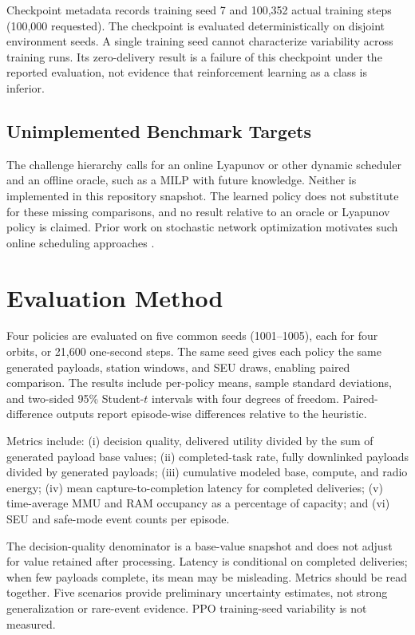 \documentclass[11pt,letterpaper]{article}
\begin{document}
Checkpoint metadata records training seed 7 and 100,352 actual training steps (100,000 requested). The checkpoint is evaluated deterministically on disjoint environment seeds. A single training seed cannot characterize variability across training runs. Its zero-delivery result is a failure of this checkpoint under the reported evaluation, not evidence that reinforcement learning as a class is inferior.

\subsection{Unimplemented Benchmark Targets}
The challenge hierarchy calls for an online Lyapunov or other dynamic scheduler and an offline oracle, such as a MILP with future knowledge. Neither is implemented in this repository snapshot. The learned policy does not substitute for these missing comparisons, and no result relative to an oracle or Lyapunov policy is claimed. Prior work on stochastic network optimization motivates such online scheduling approaches \cite{neely}.

\section{Evaluation Method}
Four policies are evaluated on five common seeds (1001--1005), each for four orbits, or 21,600 one-second steps. The same seed gives each policy the same generated payloads, station windows, and SEU draws, enabling paired comparison. The results include per-policy means, sample standard deviations, and two-sided 95\% Student-$t$ intervals with four degrees of freedom. Paired-difference outputs report episode-wise differences relative to the heuristic.

Metrics include: (i) decision quality, delivered utility divided by the sum of generated payload base values; (ii) completed-task rate, fully downlinked payloads divided by generated payloads; (iii) cumulative modeled base, compute, and radio energy; (iv) mean capture-to-completion latency for completed deliveries; (v) time-average MMU and RAM occupancy as a percentage of capacity; and (vi) SEU and safe-mode event counts per episode.

The decision-quality denominator is a base-value snapshot and does not adjust for value retained after processing. Latency is conditional on completed deliveries; when few payloads complete, its mean may be misleading. Metrics should be read together. Five scenarios provide preliminary uncertainty estimates, not strong generalization or rare-event evidence. PPO training-seed variability is not measured.
\end{document}
